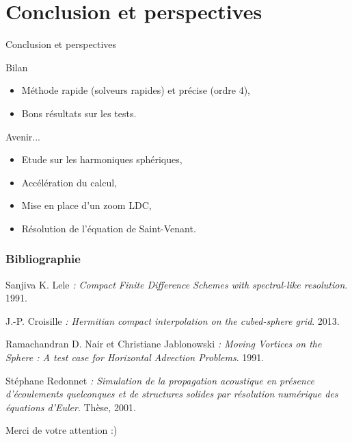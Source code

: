 \documentclass[11pt]{beamer}
\begin{document}
\section{Conclusion et perspectives}
\begin{frame}{Conclusion et perspectives}
\begin{block}{Bilan}
\begin{itemize}
\item Méthode rapide (solveurs rapides) et précise (ordre 4),

\item Bons résultats sur les tests.
\end{itemize}
\end{block}

\pause

\begin{block}{Avenir...}
\begin{itemize}
\item Etude sur les harmoniques sphériques,

\item Accélération du calcul,

\item Mise en place d'un zoom LDC,

\item Résolution de l'équation de Saint-Venant.
\end{itemize}
\end{block}
\end{frame}


\begin{frame}
\frametitle{Bibliographie}

\begin{thebibliography}{9}
        

\scriptsize{

         Sanjiva K. Lele
         \emph{: Compact Finite Difference Schemes with spectral-like resolution}.
         1991.

         J.-P. Croisille
         \emph{: Hermitian compact interpolation on the cubed-sphere grid}.
         2013.

         Ramachandran D. Nair et Christiane Jablonowski
         \emph{: Moving Vortices on the Sphere : A test case for Horizontal Advection Problems}.
         1991.

         Stéphane Redonnet
         \emph{: Simulation de la propagation acoustique en présence d'écoulements quelconques et de structures solides par résolution numérique des équations d'Euler}.
         Thèse, 2001.
    
    }     
         
         
         
\end{thebibliography}
\end{frame}

\begin{frame}
\begin{center}
Merci de votre attention :)
\end{center}
\end{frame}
\end{document}
